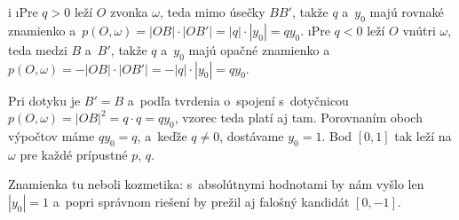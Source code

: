 {    \begitems \style i
    \i Pre $q>0$ leží $O$ zvonka $\omega$, teda mimo úsečky $BB'$, takže $q$ a~$y_0$ majú rovnaké znamienko a~$p(O,\omega)=|OB| \cdot |OB'|=|q| \cdot |y_0|=qy_0$.
    \i Pre $q<0$ leží $O$ vnútri $\omega$, teda medzi $B$ a~$B'$, takže $q$ a~$y_0$ majú opačné znamienko a~$p(O,\omega)=-|OB| \cdot |OB'|=-|q| \cdot |y_0|=qy_0$.
    \enditems

    Pri dotyku je $B'=B$ a~podľa tvrdenia o~spojení s~dotyčnicou $p(O,\omega)=|OB|^2=q \cdot q=qy_0$, vzorec teda platí aj tam. Porovnaním oboch výpočtov máme $qy_0=q$, a~keďže $q \neq 0$, dostávame $y_0=1$. Bod $[0,1]$ tak leží na $\omega$ pre každé prípustné $p$, $q$.

    Znamienka tu neboli kozmetika: s~absolútnymi hodnotami by nám vyšlo len $|y_0|=1$ a~popri správnom riešení by prežil aj falošný kandidát $[0,-1]$.
}

